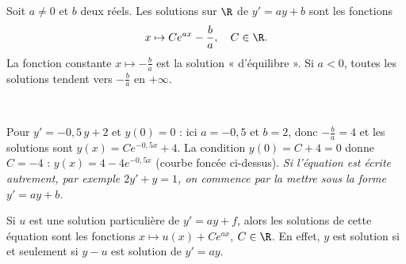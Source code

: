 \noindent
\begin{minipage}[c]{0.54\linewidth}
\begin{theoreme}[Solutions de $y'=ay+b$]
\raggedright
Soit $a\neq0$ et $b$ deux réels. Les solutions sur $\R$ de $y'=ay+b$ sont les fonctions
\[ x\mapsto Ce^{ax}-\frac ba,\quad C\in\R. \]
La fonction constante $x\mapsto-\frac ba$ est la solution « d'équilibre ». Si $a<0$, toutes les solutions tendent vers
$-\frac ba$ en $+\infty$.
\end{theoreme}
\end{minipage}\hfill
\begin{minipage}[c]{0.42\linewidth}
\centering
{}\\[0.5mm]
\end{minipage}

\begin{savoirfaire}
Pour $y'=-0{,}5\,y+2$ et $y(0)=0$ : ici $a=-0{,}5$ et $b=2$, donc $-\frac ba=4$ et les solutions sont $y(x)=Ce^{-0{,}5x}+4$.
La condition $y(0)=C+4=0$ donne $C=-4$ : $y(x)=4-4e^{-0{,}5x}$ (courbe foncée ci-dessus). \emph{Si l'équation est écrite
autrement, par exemple $2y'+y=1$, on commence par la mettre sous la forme $y'=ay+b$.}
\end{savoirfaire}

\begin{propriete}[Équation avec second membre $y'=ay+f$]
Si $u$ est une solution particulière de $y'=ay+f$, alors les solutions de cette équation sont les fonctions $x\mapsto u(x)+Ce^{ax}$,
$C\in\R$. En effet, $y$ est solution si et seulement si $y-u$ est solution de $y'=ay$.
\end{propriete}

